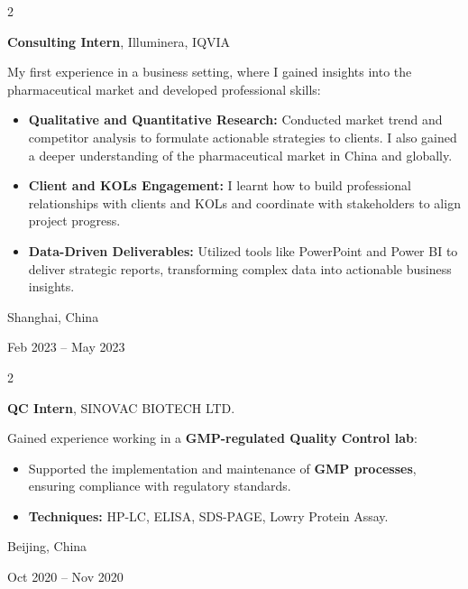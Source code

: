 \documentclass[10pt, letterpaper]{article}
\newenvironment{highlights}{
    \begin{itemize}[
        topsep=0.10 cm,
        parsep=0.10 cm,
        partopsep=0pt,
        itemsep=0pt,
        leftmargin=0.4 cm + 10pt
    ]
}{
    \end{itemize}
} %
\newenvironment{twocolentry}[2][]{
    \onecolentry
    \def\secondColumn{#2}
    \setcolumnwidth{\fill, 4.5 cm}
    \begin{paracol}{2}
}{
    \switchcolumn \raggedleft \secondColumn
    \end{paracol}
    \endonecolentry
} %
\begin{document}
        \begin{twocolentry}{
    Shanghai, China

    Feb 2023 – May 2023
}
    \textbf{Consulting Intern}, Illuminera, IQVIA

    \vspace{0.1cm}
    
    My first experience in a business setting, where I gained insights into the pharmaceutical market and developed professional skills:
    

    \begin{highlights}
        \item \textbf{Qualitative and Quantitative Research:} Conducted market trend and competitor analysis to formulate actionable strategies to clients. I also gained a deeper understanding of the pharmaceutical market in China and globally.

        \vspace{0.1cm}
        
        \item \textbf{Client and KOLs Engagement:} I learnt how to build professional relationships with clients and KOLs and coordinate with stakeholders to align project progress.

        \vspace{0.1cm}
        
        \item \textbf{Data-Driven Deliverables:} Utilized tools like PowerPoint and Power BI to deliver strategic reports, transforming complex data into actionable business insights.
    \end{highlights}
\end{twocolentry}

        \vspace{0.3 cm}

        \begin{twocolentry}{
    Beijing, China

    Oct 2020 – Nov 2020
}
    \textbf{QC Intern}, SINOVAC BIOTECH LTD.

    \vspace{0.1cm}
    
    Gained experience working in a \textbf{GMP-regulated Quality Control lab}:
    

    \begin{highlights}
        \item Supported the implementation and maintenance of \textbf{GMP processes}, ensuring compliance with regulatory standards.

        \vspace{0.1cm}
        
        \item \textbf{Techniques:} HP-LC, ELISA, SDS-PAGE, Lowry Protein Assay.

    
    
    \end{highlights}
\end{twocolentry}
    
\end{document}
